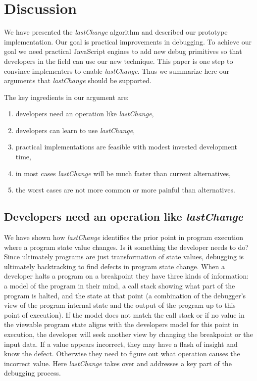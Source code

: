 \documentclass[runningheads,a4paper]{llncs}
\begin{document}
\section{Discussion}

We have presented the \textit{lastChange} algorithm and described our
prototype implementation. Our goal is practical improvements in debugging. To achieve our goal we need practical JavaScript engines
to add new debug primitives so that developers in the field can use our new technique. This paper is
one step to convince implementers to enable \textit{lastChange}.
Thus we summarize here our arguments that \textit{lastChange} should be supported.

The key ingredients in our argument are: 
\begin{enumerate}
   \item developers need an operation like \textit{lastChange}, 
   \item developers can learn to use \textit{lastChange}, 
   \item practical implementations are feasible with modest
invested development time,
   \item in most cases \textit{lastChange} will be much faster than current alternatives,
   \item the worst cases are not more common or more painful than
alternatives.
\end{enumerate}

\subsection{Developers need an operation like \protect\textit{lastChange} }

We have shown how \textit{lastChange} identifies the prior point in
program execution where a program state value changes. Is it something
the developer needs to do?  Since ultimately programs are just
transformation of state values, debugging is ultimately backtracking
to find defects in program state change.  When a developer halts a
program on a breakpoint they have three kinds of information: a model
of the program in their mind, a call stack showing what part of the
program is halted, and the state at that point (a combination of the
debugger's view of the program internal state and the output of the
program up to this point of execution). If the model does not match
the call stack or if no value in the viewable program state aligns
with the developers model for this point in execution, the developer
will seek another view by changing the breakpoint or the input
data. If a value appears incorrect, they may have a flash of insight
and know the defect. Otherwise they need to figure out what operation
causes the incorrect value. Here \textit{lastChange} takes over and addresses a key
part of the debugging process.
\end{document}
